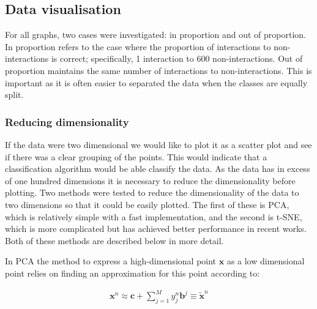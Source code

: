 


\subsection{Data visualisation}
\label{dataviz}

For all graphs, two cases were investigated: in proportion and out of proportion.
In proportion refers to the case where the proportion of interactions to non-interactions is correct; specifically, 1 interaction to 600 non-interactions.
Out of proportion maintains the same number of interactions to non-interactions.
This is important as it is often easier to separated the data when the classes are equally split.

\subsubsection*{Reducing dimensionality}
If the data were two dimensional we would like to plot it as a scatter plot and see if there was a clear grouping of the points.
This would indicate that a classification algorithm would be able classify the data.
As the data has in excess of one hundred dimensions it is necessary to reduce the dimensionality before plotting.
Two methods were tested to reduce the dimensionality of the data to two dimensions so that it could be easily plotted.
The first of these is \ac{PCA}, which is relatively simple with a fast implementation, and the second is t-SNE, which is more complicated but has achieved better performance in recent works.
Both of these methods are described below in more detail.

In \ac{PCA} the method to express a high-dimensional point $\pmb{x}$ as a low dimensional point relies on finding an approximation for this point according to\autocite[330]{barber_bayesian_2013}:


\begin{align}
    \pmb{x}^{n} \approx \pmb{c} + \sum_{j=1}^{M} y_{j}^{n} \pmb{b}^{j} \equiv \tilde{\pmb{x}}^{n}
\end{align}

